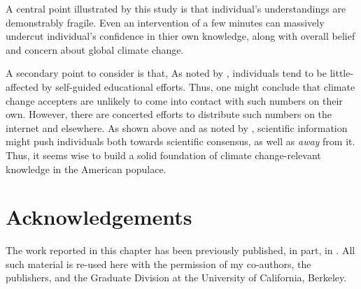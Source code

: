 A central point illustrated by this study is that individual's understandings
are demonstrably fragile. Even an intervention of a few minutes can massively
undercut individual's confidence in thier own knowledge, along with overall
belief and concern about global climate change.

A secondary point to consider is that, As noted by \textcite{kahan,mccright},
individuals tend to be little-affected by self-guided educational efforts. Thus,
one might conclude that climate change accepters are unlikely to come into
contact with such numbers on their own.  However, there are concerted efforts to
distribute such numbers on the internet and elsewhere. As shown above and as
noted by \cite{mccright}, scientific information might push individuals both
towards scientific consensus, as well as \emph{away} from it.  Thus, it seems
wise to build a solid foundation of climate change-relevant knowledge in the
American populace. 

\section*{Acknowledgements}

The work reported in this chapter has been previously published, in part, in
\textcite{clark_knowledge_inpress}.  All such material is re-used here with the
permission of my co-authors, the publishers, and the Graduate Division at the
University of California, Berkeley.
